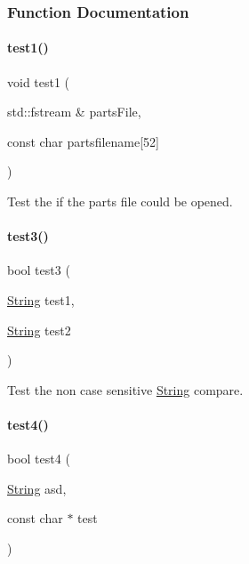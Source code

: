 \subsubsection{Function Documentation}
\mbox{\label{atest_8h_a377b49f7a65ef678441feafbbb111fd0}} 
\paragraph{\texorpdfstring{test1()}{test1()}}
{\footnotesize\ttfamily void test1 (\begin{DoxyParamCaption}\item[{std\+::fstream \&}]{parts\+File,  }\item[{const char}]{partsfilename\mbox{[}52\mbox{]} }\end{DoxyParamCaption})}



Test the if the parts file could be opened. 

\mbox{\label{atest_8h_a6e6df2af48d16780853d6eddcb8c8bc4}} 
\paragraph{\texorpdfstring{test3()}{test3()}}
{\footnotesize\ttfamily bool test3 (\begin{DoxyParamCaption}\item[{\mbox{\hyperlink{class_string}{String}}}]{test1,  }\item[{\mbox{\hyperlink{class_string}{String}}}]{test2 }\end{DoxyParamCaption})}



Test the non case sensitive \mbox{\hyperlink{class_string}{String}} compare. 

\mbox{\label{atest_8h_ab545ece7a108a6470a3dc2161ba0008b}} 
\paragraph{\texorpdfstring{test4()}{test4()}}
{\footnotesize\ttfamily bool test4 (\begin{DoxyParamCaption}\item[{\mbox{\hyperlink{class_string}{String}}}]{asd,  }\item[{const char $\ast$}]{test }\end{DoxyParamCaption})}



